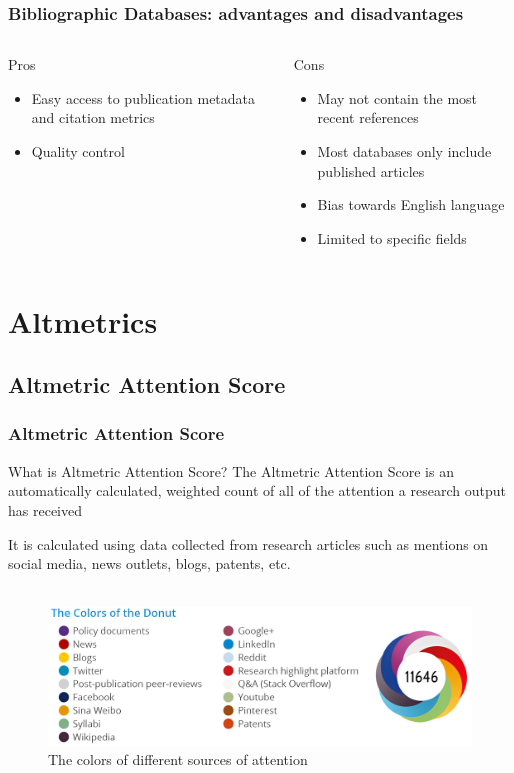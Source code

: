 \documentclass{beamer}
\newcommand{\pros}{\item[{\textcolor[HTML]{3C8031}{\ding{51}}}]}
\newcommand{\cons}{\item[\textcolor{red}{\ding{54}}]}
\begin{document}
\begin{frame}
    \frametitle{Bibliographic Databases: advantages and disadvantages}
    \begin{columns}[T]
        \begin{column}{.5\textwidth}
            \centering Pros
            \begin{itemize}[<+->]
                \pros Easy access to publication metadata and citation metrics
                \pros Quality control
            \end{itemize}
        \end{column}
        \begin{column}{.5\textwidth}
            \centering Cons
            \begin{itemize}[<+->]
                \cons May not contain the most recent references
                \cons Most databases only include published articles
                \cons Bias towards English language
                \cons Limited to specific fields
            \end{itemize}
        \end{column}
    \end{columns}
\end{frame}


\section{Altmetrics}
\subsection{Altmetric Attention Score}
\begin{frame}
    \frametitle{Altmetric Attention Score}
    \begin{block}{What is Altmetric Attention Score?}
        The Altmetric Attention Score is an automatically calculated, weighted count of all of the attention a research output has received
    \end{block}

    It is calculated using data collected from research articles such as mentions
    on social media, news outlets, blogs, patents, etc.\\~\

    \begin{figure}[h]
        \includegraphics[height=0.42\textheight]{altscore.png}
        \caption{The colors of different sources of attention}
    \end{figure}
\end{frame}
\end{document}
